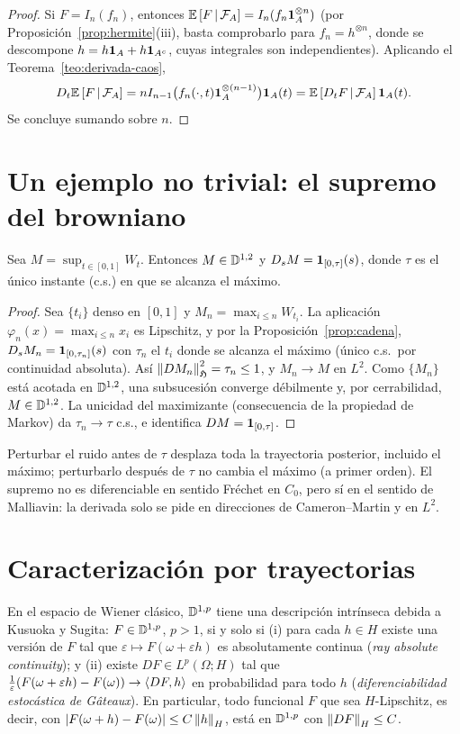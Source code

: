 \begin{proof}
Si $F=I_n(f_n)$, entonces $\mathbb{E}\left[F\,\middle|\,\mathcal{F}_A\right]=I_n(f_n\mathbf{1}_A^{\otimes n})$ (por Proposición~\ref{prop:hermite}(iii), basta
comprobarlo para $f_n=h^{\otimes n}$, donde se descompone $h=h\mathbf{1}_A+h\mathbf{1}_{A^c}$, cuyas integrales son
independientes). Aplicando el Teorema~\ref{teo:derivada-caos},
\[
  D_t\mathbb{E}\left[F\,\middle|\,\mathcal{F}_A\right]=nI_{n-1}\big(f_n(\cdot,t)\mathbf{1}_A^{\otimes(n-1)}\big)\mathbf{1}_A(t)=\mathbb{E}\left[D_tF\,\middle|\,\mathcal{F}_A\right]\mathbf{1}_A(t).
\]
Se concluye sumando sobre $n$.
\end{proof}

\section{Un ejemplo no trivial: el supremo del browniano}

\begin{proposicion}\label{prop:supremo}
Sea $M=\sup_{t\in[0,1]}W_t$. Entonces $M\in\mathbb{D}^{1,2}$ y $D_sM=\mathbf{1}_{[0,\tau]}(s)$, donde $\tau$ es
el único instante \textup{(c.s.)} en que se alcanza el máximo.
\end{proposicion}

\begin{proof}
Sea $\{t_i\}$ denso en $[0,1]$ y $M_n=\max_{i\le n}W_{t_i}$. La aplicación $\varphi_n(x)=\max_{i\le n}x_i$
es Lipschitz, y por la Proposición~\ref{prop:cadena}, $D_sM_n=\mathbf{1}_{[0,\tau_n]}(s)$ con $\tau_n$ el $t_i$ donde se alcanza el máximo
(único c.s.\ por continuidad absoluta). Así $\left\lVert DM_n\right\rVert^2_{\mathfrak{H}}=\tau_n\le1$, y $M_n\to M$ en $L^2$. Como $\{M_n\}$
está acotada en $\mathbb{D}^{1,2}$, una subsucesión converge débilmente y, por cerrabilidad, $M\in\mathbb{D}^{1,2}$. La
unicidad del maximizante (consecuencia de la propiedad de Markov) da $\tau_n\to\tau$ c.s., e identifica
$DM=\mathbf{1}_{[0,\tau]}$.
\end{proof}

\begin{intuicion}
Perturbar el ruido antes de $\tau$ desplaza toda la trayectoria posterior, incluido el máximo;
perturbarlo después de $\tau$ no cambia el máximo (a primer orden). El supremo no es
diferenciable en sentido Fréchet en $C_0$, pero sí en el sentido de Malliavin: la derivada solo
se pide en direcciones de Cameron--Martin y en $L^2$.
\end{intuicion}

\section{Caracterización por trayectorias}
En el espacio de Wiener clásico, $\mathbb{D}^{1,p}$ tiene una descripción intrínseca debida a Kusuoka y
Sugita: $F\in\mathbb{D}^{1,p}$, $p>1$, si y solo si (i) para cada $h\in H$ existe una versión de $F$ tal
que $\varepsilon\mapsto F(\omega+\varepsilon h)$ es absolutamente continua (\emph{ray absolute continuity}); y (ii) existe $DF\in
L^p(\Omega;H)$ tal que $\frac1\varepsilon(F(\omega+\varepsilon h)-F(\omega))\to\left\langle DF, h\right\rangle$ en probabilidad para todo $h$ (\emph{diferenciabilidad
estocástica de Gâteaux}). En particular, todo funcional $F$ que sea $H$-Lipschitz, es decir, con
$\left\lvert F(\omega+h)-F(\omega)\right\rvert\le C\left\lVert h\right\rVert_H$, está en $\mathbb{D}^{1,p}$ con $\left\lVert DF\right\rVert_H\le C$.
